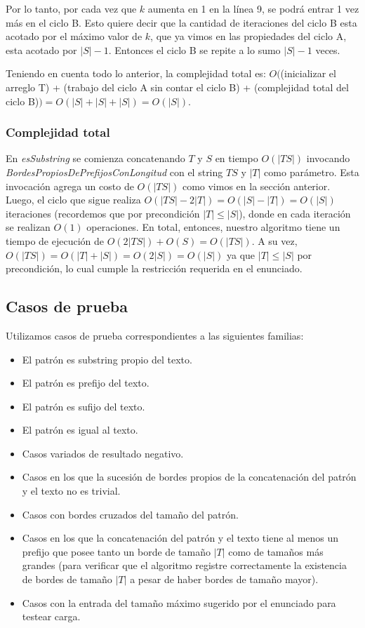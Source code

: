 Por lo tanto, por cada vez que $k$ aumenta en 1 en la línea 9, se podrá entrar 1 vez más en el ciclo B. Esto
quiere decir que la cantidad de iteraciones del ciclo B esta acotado por el máximo valor de $k$, que ya
vimos en las propiedades del ciclo A, esta acotado por $|S|-1$. Entonces el ciclo B se repite a lo sumo $|S|-1$
veces.

Teniendo en cuenta todo lo anterior, la complejidad total es:
$O($(inicializar el arreglo T) + (trabajo del ciclo A sin contar el ciclo B) + (complejidad total del ciclo B)$)
= O(|S| + |S| + |S|) = O(|S|)$.

\subsubsection{Complejidad total}

En \textit{esSubstring} se comienza concatenando $T$ y $S$ en tiempo $O(|TS|)$ invocando \textit{BordesPropiosDePrefijosConLongitud} con el string $TS$ y $|T|$ como parámetro. Esta invocación agrega un costo de $O(|TS|)$ como vimos en la sección anterior. Luego, el ciclo que sigue realiza $O(|TS|-2|T|) = O(|S|-|T|) = O(|S|)$ iteraciones (recordemos que por precondición $|T| \leq |S|$), donde en cada iteración se realizan $O(1)$ operaciones. En total, entonces, nuestro algoritmo tiene un tiempo de ejecución de $O(2|TS|) + O(S) = O(|TS|)$. A su vez, $O(|TS|) = O(|T|+|S|) = O(2|S|) = O(|S|)$ ya que $|T| \leq |S|$ por precondición, lo cual cumple la restricción requerida en el enunciado.

\subsection{Casos de prueba}

Utilizamos casos de prueba correspondientes a las siguientes familias:
\begin{itemize}
\item El patrón es substring propio del texto.
\item El patrón es prefijo del texto.
\item El patrón es sufijo del texto.
\item El patrón es igual al texto.
\item Casos variados de resultado negativo.
\item Casos en los que la sucesión de bordes propios de la concatenación del patrón y el texto no es trivial.
\item Casos con bordes cruzados del tamaño del patrón.
\item Casos en los que la concatenación del patrón y el texto tiene al menos un prefijo que posee tanto un borde de tamaño $|T|$ como de tamaños más grandes (para verificar que el algoritmo registre correctamente la existencia de bordes de tamaño $|T|$ a pesar de haber bordes de tamaño mayor).
\item Casos con la entrada del tamaño máximo sugerido por el enunciado para testear carga.
\end{itemize}


